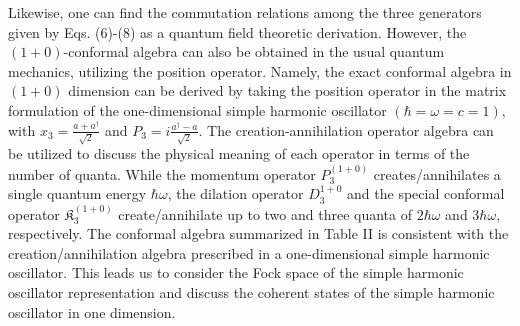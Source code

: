 \documentclass[%
 reprint,
superscriptaddress,
 amsmath,amssymb,
 aps,
]{revtex4-2}
\begin{document}
Likewise, one can find the commutation relations among the three generators given by Eqs. (6)-(8) as a quantum field theoretic derivation. 
However, the $(1+0)$-conformal algebra can also be obtained in the usual quantum mechanics, utilizing the position operator. Namely, the exact conformal algebra in $(1+0)$ dimension can be derived by taking the position operator in the matrix formulation of the one-dimensional simple harmonic oscillator $(\hbar=\omega=c=1)$, with $x_3=\frac{a+a^{\dagger}}{\sqrt{2}}$ and $P_3=i\frac{a^{\dagger}-a}{\sqrt{2}}$.
The creation-annihilation operator algebra can be utilized to discuss the physical meaning of each operator in terms of the number of quanta. While the momentum operator $P_3^{(1+0)}$ creates/annihilates a single quantum energy $\hbar \omega$, the dilation operator $D_3^{1+0}$ and the special conformal operator $\mathfrak{K}_{{3}}^{(1+0)}$ create/annihilate up to two and three quanta of $2\hbar\omega$ and $3\hbar\omega$, respectively.
The conformal algebra summarized in Table II is consistent with the creation/annihilation algebra prescribed in a one-dimensional simple harmonic oscillator.  
This leads us to consider the Fock space of the simple harmonic oscillator representation and discuss the coherent states of the simple harmonic oscillator in one dimension. 
\end{document}
